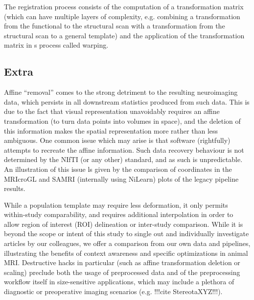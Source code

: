The registration process consists of the computation of a transformation matrix (which can have multiple layers of complexity, e.g. combining a transformation from the functional to the structural scan with a transformation from the structural scan to a general template) and the application of the transformation matrix in s process called warping.

	\subsection{Extra}
	Affine “removal” comes to the strong detriment to the resulting neuroimaging data, which persists in all downstream statistics produced from such data.
	This is due to the fact that visual representation unavoidably requires an affine transformation (to turn data points into volumes in space), and the deletion of this information makes the spatial representation more rather than less ambiguous.
	One common issue which may arise is that software (rightfully) attempts to recreate the affine information.
	Such data recovery behaviour is not determined by the NIfTI (or any other) standard, and as such is unpredictable.
	An illustration of this issue ls given by the comparison of coordinates in the MRIcroGL and SAMRI (internally using NiLearn) plots of the legacy pipeline results.
	
	While a population template may require less deformation, it only permits within-study comparability, and requires additional interpolation in order to allow region of interest (ROI) delineation or inter-study comparison.
	While it is beyond the scope or intent of this study to single out and individually investigate articles by our colleagues, we offer a comparison from our own data and pipelines, illustrating the benefits of context awareness and specific optimizations in animal MRI.
	Destructive hacks in particular (such as affine transformation deletion or scaling) preclude both the usage of preprocessed data and of the preprocessing workflow itself in size-sensitive applications, which may include a plethora of diagnostic or preoperative imaging scenarios (e.g. !!!cite StereotaXYZ!!!).
